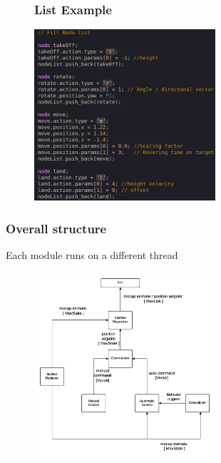 \documentclass[xcolor=dvipsnames]{beamer}
\begin{document}
\begin{frame}
\begin{figure}
\frametitle{List Example}

\includegraphics[width = 0.6\textwidth]{f/nodelist.png}
\end{figure}
\end{frame}

\begin{frame}
\frametitle{Overall structure}
Each module runs on a different thread
\begin{figure}
\includegraphics[width = 0.6\textwidth]{f/arch_scheme.png}
\end{figure}
\end{frame}
\end{document}
